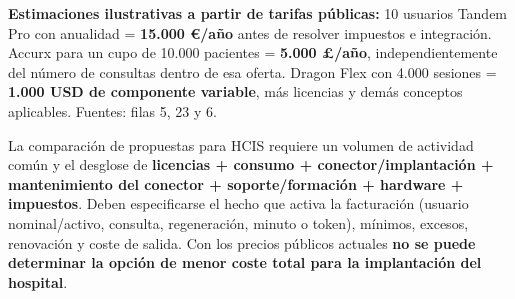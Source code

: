 \begin{landscape}
\textbf{Estimaciones ilustrativas a partir de tarifas públicas:} 10 usuarios Tandem Pro con anualidad = \textbf{15.000 €/\allowbreak{}año} antes de resolver impuestos e integración. Accurx para un cupo de 10.000 pacientes = \textbf{5.000 £/\allowbreak{}año}, independientemente del número de consultas dentro de esa oferta. Dragon Flex con 4.000 sesiones = \textbf{1.000 USD de componente variable}, más licencias y demás conceptos aplicables. Fuentes: filas 5, 23 y 6.

La comparación de propuestas para HCIS requiere un volumen de actividad común y el desglose de \textbf{licencias + consumo + conector/\allowbreak{}implantación + mantenimiento del conector + soporte/\allowbreak{}formación + hardware + impuestos}. Deben especificarse el hecho que activa la facturación (usuario nominal/\allowbreak{}activo, consulta, regeneración, minuto o token), mínimos, excesos, renovación y coste de salida. Con los precios públicos actuales \textbf{no se puede determinar la opción de menor coste total para la implantación del hospital}.
\endgroup
\end{landscape}
